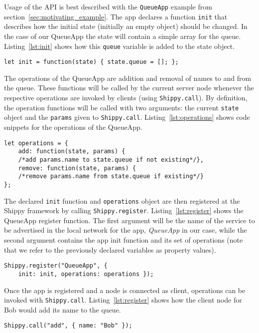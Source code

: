 Usage of the API is best described with the \texttt{QueueApp} example from section~\ref{sec:motivating_example}.
The app declares a function \texttt{init} that describes how the initial state (initially an empty object) should be changed.
In the case of our QueueApp the state will contain a simple array for the queue.
Listing~\ref{lst:init} shows how this \texttt{queue} variable is added to the state object.

\begin{lstlisting}[caption={QueueApp init function},label={lst:init}]
let init = function(state) { state.queue = []; };
\end{lstlisting}

The operations of the QueueApp are addition and removal of names to and from the queue.
These functions will be called by the current server node whenever the respective operations are invoked by clients (using \texttt{Shippy.call}).
By definition, the operation functions will be called with two arguments: the current \texttt{state} object and the \texttt{params} given to \texttt{Shippy.call}.
Listing~\ref{lst:operations} shows code snippets for the operations of the QueueApp.

\begin{lstlisting}[caption={QueueApp operations},label={lst:operations}]
let operations = {
    add: function(state, params) {
    /*add params.name to state.queue if not existing*/},
    remove: function(state, params) {
    /*remove params.name from state.queue if existing*/}
};
\end{lstlisting}

The declared \texttt{init} function and \texttt{operations} object are then registered at the Shippy framework by calling \texttt{Shippy.register}.
Listing~\ref{lst:register} shows the QueueApp register function.
The first argument will be the name of the service to be advertised in the local network for the app, \textit{QueueApp} in our case,
 while the second argument contains the app init function and its set of operations (note that we refer to the previously declared variables as property values).


\begin{lstlisting}[caption={Shippy.register},label={lst:register}]
Shippy.register("QueueApp", {
    init: init, operations: operations });
\end{lstlisting}

Once the app is registered and a node is connected as client, operations can be invoked with \texttt{Shippy.call}. Listing~\ref{lst:register} shows how the client node for Bob would add its name to the queue.
\begin{lstlisting}[caption={Shippy.call},label={lst:call}]
Shippy.call("add", { name: "Bob" });
\end{lstlisting}

